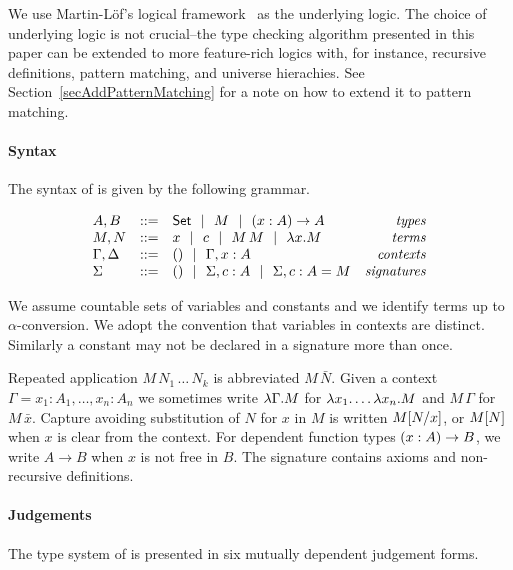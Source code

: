 
We use Martin-L\"of's logical
framework~\cite{nordstroemPeterssonSmith:handbookLICS} as the underlying logic.
%
The choice of underlying logic is not crucial--the type checking algorithm
presented in this paper can be extended to more feature-rich logics with, for
instance, recursive definitions, pattern matching, and universe hierachies.
\if {}
See Section~\ref{secAddPatternMatching} for a note on how to extend it to
pattern matching.
\fi

\paragraph*{Syntax} The syntax of {\Core} is given by the following grammar.

{\small
\[\begin{array}{lclr}
    A, B   & ::= & \SET \Or M \Or \PI xAA	      & \mathit{types} \\
    M, N   & ::= & x \Or c \Or M\,M \Or \LAM xM	      & \mathit{terms} \\
    \Gamma, \Delta & ::= & () \Or \Gamma,x:A	      & \mathit{contexts} \\
    \Sigma & ::= & () \Or \Sigma,c:A \Or \Sigma,c:A=M & \mathit{signatures} \\
\end{array}\]
}

We assume countable sets of variables and constants and we identify terms up to
$\alpha$-conversion. We adopt the convention that variables in contexts are
distinct. Similarly a constant may not be declared in a signature more than
once.

Repeated application $M \, N_1 \, \dots \, N_k$ is abbreviated $M \, \bar N$.
%
Given a context $\Gamma = x_1 : A_1, \ldots, x_n : A_n$ we sometimes write
$\LAM \Gamma M$ for $\LAM {x_1} \ldots \LAM {x_n} M$ and $M \, \Gamma$ for $M
\, \bar x$.
%
Capture avoiding substitution of $N$ for $x$ in $M$ is written $\Subst M x N$,
or $\SubstD M N$ when $x$ is clear from the context.
%
For dependent function types $\PI xAB$, we write $A \to B$ when $x$ is not free
in $B$.
%
The signature contains axioms and non-recursive definitions.

\paragraph*{Judgements} The type system of {\Core} is presented in six mutually
dependent judgement forms.

